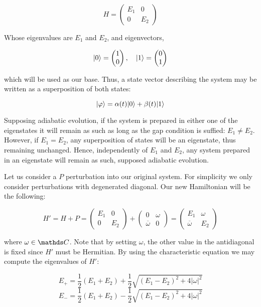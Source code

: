 $$
	H = 
	\begin{pmatrix}
		E_1 & 0 \\
		0 & E_2 
	\end{pmatrix}
$$

Whose eigenvalues are $E_1$ and $E_2$, and eigenvectors,

$$
	|0\rangle = 
	\begin{pmatrix}
	1 \\
	0 
	\end{pmatrix}, \quad
	|1\rangle = 
	\begin{pmatrix}
	0 \\
	1 
	\end{pmatrix}
$$

which will be used as our base. Thus, a state vector describing the system may be written as a superposition of both states:

$$ |\varphi\rangle = \alpha(t)|0\rangle + \beta(t)|1\rangle $$

Supposing adiabatic evolution, if the system is prepared in either one of the eigenstates it will remain as such as long as the gap condition is suffied: $E_1 \neq E_2$. However, if $E_1 = E_2$, any superposition of states will be an eigenstate, thus remaining unchanged. Hence, independently of $E_1$ and $E_2$, any system prepared in an eigenstate will remain as such, supposed adiabatic evolution.

Let us consider a $P$ perturbation into our original system. For simplicity we only consider perturbations with degenerated diagonal. Our new Hamiltonian will be the following:

$$
	H' = H + P =
	\begin{pmatrix}
	E_1 & 0 \\
	0 & E_2 
	\end{pmatrix} +
	\begin{pmatrix}
	0 & \omega \\
	\overline \omega & 0 
	\end{pmatrix} = 
	\begin{pmatrix}
	E_1 & \omega \\
	\overline \omega & E_2 
	\end{pmatrix}
$$

where $\omega \in \C$. Note that by setting $\omega$, the other value in the antidiagonal is fixed since $H'$ must be Hermitian. By using the characteristic equation we may compute the eigenvalues of $H'$:

$$ E_+ = \frac{1}{2}(E_1 + E_2) + \frac{1}{2}\sqrt{(E_1 - E_2)^2 + 4|\omega|^2} $$
$$ E_- = \frac{1}{2}(E_1 + E_2) - \frac{1}{2}\sqrt{(E_1 - E_2)^2 + 4|\omega|^2} $$


